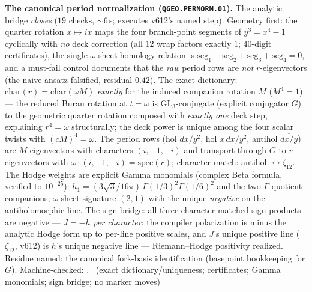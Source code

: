 \documentclass[11pt,a4paper]{article}
\theoremstyle{definition}
\begin{document}
\par\smallskip\noindent\textbf{The canonical period normalization
(\texttt{QGEO.PERNORM.01}).}
The analytic bridge \emph{closes} ($19$ checks, ${\sim}6$\,s;
executes v612's named step).  Geometry first: the quarter rotation
$x\mapsto ix$ maps the four branch-point segments of $y^3=x^4-1$
cyclically with \emph{no} deck correction (all $12$ wrap factors
exactly $1$; $40$-digit certificates), the single $\omega$-sheet
homology relation is $\mathrm{seg}_1+\mathrm{seg}_2+\mathrm{seg}_3
+\mathrm{seg}_4=0$, and a must-fail control documents that the
\emph{raw} period rows are \emph{not} $r$-eigenvectors (the naive
ansatz falsified, residual $0.42$).  The exact dictionary:
$\mathrm{char}(r)=\mathrm{char}(\omega M)$ \emph{exactly} for the
induced companion rotation $M$ ($M^4=1$) --- the reduced Burau
rotation at $t=\omega$ is $\mathrm{GL}_3$-conjugate (explicit
conjugator $G$) to the geometric quarter rotation composed with
\emph{exactly one} deck step, explaining $r^4=\omega$ structurally;
the deck power is unique among the four scalar twists with
$(cM)^4=\omega$.  The period rows (hol $dx/y^2$, hol $x\,dx/y^2$,
antihol $\overline{dx/y}$) are $M$-eigenvectors with characters
$(i,-1,-i)$ and transport through $G$ to $r$-eigenvectors with
$\omega\cdot(i,-1,-i)=\mathrm{spec}(r)$; character match: antihol
$\leftrightarrow\zeta_{12}$.  The Hodge weights are explicit Gamma
monomials (complex Beta formula, verified to $10^{-25}$):
$h_1=(3\sqrt3/16\pi)\,\Gamma(1/3)^2\Gamma(1/6)^2$ and the two
$\Gamma$-quotient companions; $\omega$-sheet signature $(2,1)$ with
the unique \emph{negative} on the antiholomorphic line.  The sign
bridge: all three character-matched sign products are negative ---
$J=-h$ \emph{per character}: the compiler polarization is minus the
analytic Hodge form up to per-line positive scales, and $J$'s unique
positive line ($\zeta_{12}$, v612) is $h$'s unique negative line ---
Riemann--Hodge positivity realized.  Residue named: the canonical
fork-basis identification (basepoint bookkeeping for $G$).
Machine-checked: .
\mE\ (exact dictionary/uniqueness; certificates; Gamma monomials;
sign bridge; no marker moves)
\par\smallskip
\end{document}
